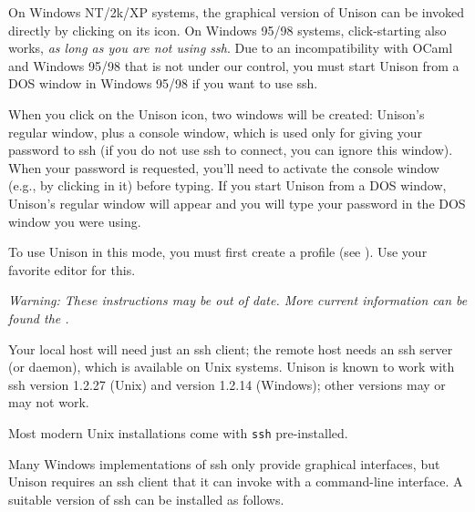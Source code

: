 \documentclass{article}
\begin{document}

On Windows NT/2k/XP systems, the graphical version of Unison can be
invoked directly by clicking on its icon.  On Windows 95/98 systems,
click-starting also works, {\em as long as you are not using ssh}.
Due to an incompatibility with OCaml and Windows 95/98 that is not
under our control, you must start Unison from a DOS window in Windows
95/98 if you want to use ssh.

When you click on the Unison icon, two windows will be created:
Unison's regular window, plus a console window, which is used only for
giving your password to ssh (if you do not use ssh to connect, you can
ignore this window).  When your password is requested, you'll need to
activate the console window (e.g., by clicking in it) before typing.
If you start Unison from a DOS window, Unison's regular window will
appear and you will type your password in the DOS window you were
using.

To use Unison in this mode, you must first create a profile (see
).  Use your favorite editor for this.


\appendix
{}

{\em Warning: These instructions may be out of date.  More current
  information can be found the
  .}

Your local host will need just an ssh client; the remote host needs an
ssh server (or daemon), which is available on Unix systems.  Unison is
known to work with ssh version 1.2.27 (Unix) and version 1.2.14
(Windows); other versions may or may not work.


Most modern Unix installations come with \verb|ssh| pre-installed.

Many Windows implementations of ssh only provide graphical interfaces,
but Unison requires an ssh client that it can invoke with a
command-line interface.  A suitable version of ssh can be installed as
follows.
\end{document}
